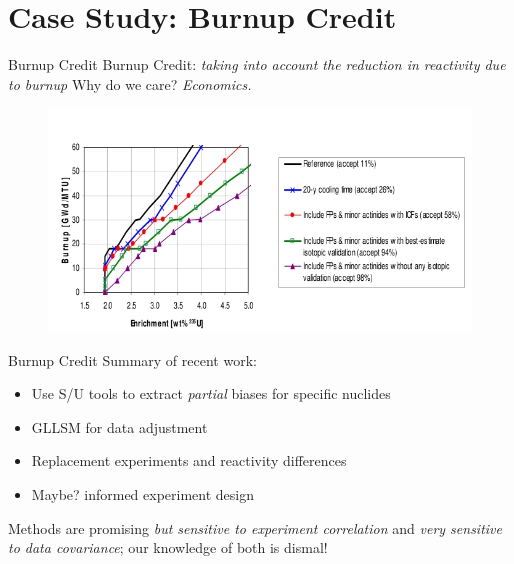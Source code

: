\documentclass[10pt]{beamer}
\begin{document}
\section{Case Study: Burnup Credit}

\begin{frame}{Burnup Credit}
Burnup Credit: {\it taking into account the reduction in reactivity due to burnup}
\vfill
Why do we care?  {\it Economics.}
  \begin{figure}
    \includegraphics[keepaspectratio, width = 3.5 in]{images/loading_curve}
  \end{figure}
\end{frame}

\begin{frame}{Burnup Credit}
Summary of recent work:
\begin{itemize}
 \item Use S/U tools to extract {\it partial} biases for specific nuclides
 \item GLLSM for data adjustment
 \item Replacement experiments and reactivity differences
 \item Maybe? informed experiment design
\end{itemize}
\vfill
Methods are promising {\it but sensitive to experiment correlation} and
{\it very sensitive to data covariance}; our knowledge of both is dismal!
\end{frame}
\end{document}
